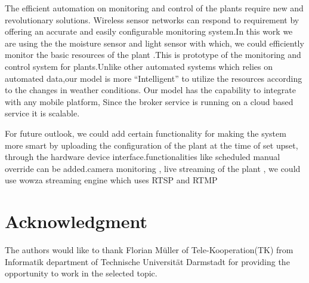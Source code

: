 \documentclass[10pt]{article}
\begin{document}
The efficient automation on monitoring and control of the plants require new and revolutionary solutions. Wireless sensor networks can respond to requirement by offering an accurate and easily configurable monitoring system.In this work we are using the the moisture sensor and light sensor with which, we could efficiently monitor the basic resources of the plant .This is prototype of the monitoring and control system for plants.Unlike other automated systems which relies on automated data,our model is more “Intelligent” to utilize the resources according to the changes in weather conditions. Our model has the capability to integrate with any mobile platform, Since the broker service is running on a cloud based service it is scalable.

For future outlook, we could add certain functionality for making the system more smart by uploading the configuration of the plant at the time of set upset, through the hardware device interface.functionalities like scheduled manual override can be added.camera monitoring , live streaming of the plant , we could use wowza streaming engine which uses RTSP and RTMP

\section*{Acknowledgment}

The authors would like to thank Florian Müller of Tele-Kooperation(TK) from Informatik department of Technische Universität Darmstadt for providing the opportunity to work in the selected topic.


\end{document}
